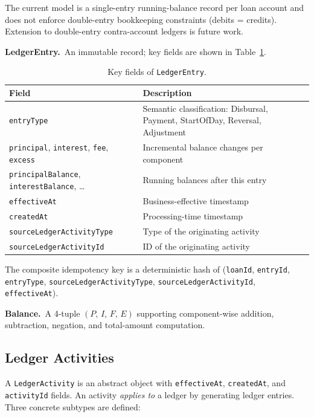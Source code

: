 \documentclass[11pt,letterpaper]{article}
\begin{document}
The current model is a single-entry running-balance record per loan
account and does not enforce double-entry bookkeeping constraints
(debits = credits). Extension to double-entry contra-account ledgers is
future work.

\textbf{LedgerEntry.}~An immutable record; key fields are shown in
Table~\ref{tab:ledgerentry}.

\begin{table}[h!]
\centering
\caption{Key fields of \texttt{LedgerEntry}.}
\label{tab:ledgerentry}
\begin{tabularx}{\linewidth}{>{\raggedright\arraybackslash}p{5.2cm}X}
  \toprule
  \textbf{Field} & \textbf{Description} \\
  \midrule
  \texttt{entryType} & Semantic classification: Disbursal, Payment,
                       StartOfDay, Reversal, Adjustment \\
  \texttt{principal}, \texttt{interest}, \texttt{fee}, \texttt{excess}
                     & Incremental balance changes per component \\
  \texttt{principalBalance}, \texttt{interestBalance}, \ldots
                     & Running balances after this entry \\
  \texttt{effectiveAt} & Business-effective timestamp \\
  \texttt{createdAt}   & Processing-time timestamp \\
  \texttt{sourceLedgerActivityType} & Type of the originating activity \\
  \texttt{sourceLedgerActivityId}   & ID of the originating activity \\
  \bottomrule
\end{tabularx}
\end{table}

The composite idempotency key is a deterministic hash of
(\texttt{loanId}, \texttt{entryId}, \texttt{entryType},
\texttt{sourceLedgerActivityType}, \texttt{sourceLedgerActivityId},
\texttt{effectiveAt}).

\textbf{Balance.}~A 4-tuple $(P,\,I,\,F,\,E)$ supporting
component-wise addition, subtraction, negation, and
total-amount computation.

\subsection{Ledger Activities}

A \texttt{LedgerActivity} is an abstract object with
\texttt{effectiveAt}, \texttt{createdAt}, and \texttt{activityId}
fields. An activity \emph{applies to} a ledger by generating ledger
entries. Three concrete subtypes are defined:
\end{document}
